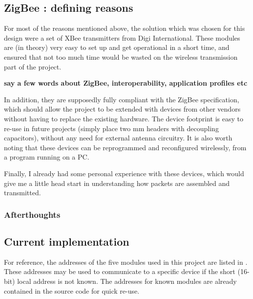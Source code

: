 \subsection{ZigBee : defining reasons}

For most of the reasons mentioned above, the solution which was chosen for this
design were a set of XBee transmitters from Digi
International. These modules are (in theory) very easy to
set up and get operational in a short time, and ensured that not too much time
would be wasted on the wireless transmission part of the project.

\textbf{say a few words about ZigBee, interoperability, application profiles
etc}

In addition, they are supposedly fully compliant with the
ZigBee specification, which should allow the project to
be extended with devices from other vendors without having to replace the
existing hardware. The device footprint is easy to re-use in future projects
(simply place two \unit[2]{mm} headers with decoupling capacitors), without any
need for external antenna circuitry. It is also worth noting that these devices
can be reprogrammed and reconfigured wirelessly, from a program running on a PC.

Finally, I already had some personal experience with these devices, which would
give me a little head start in understanding how packets are assembled and
transmitted.

\subsubsection{Afterthoughts}

\subsection{Current implementation}
For reference, the addresses of the five modules used in this project are listed
in . These addresses may be used to communicate to a specific
device if the short (16-bit) local address is not known. The addresses for known
modules are already contained in the source code for quick re-use.

